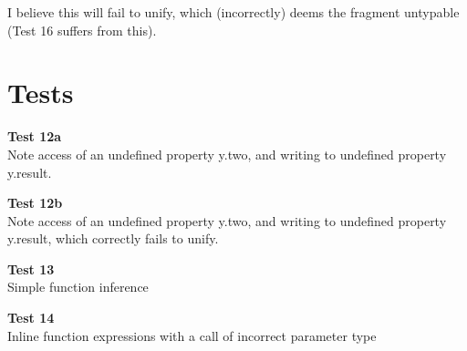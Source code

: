 \documentclass{article}
\begin{document}
	I believe this will fail to unify, which (incorrectly) deems the fragment untypable (Test 16 suffers from this).

\section{Tests}
\begin{parcolumns}[nofirstindent]{2}

 	\noindent
	\textbf{\large{Test 12a}}\\
	Note access of an undefined property y.two, and writing to undefined property y.result.

	\colplacechunks

 	\vspace{3em}
	\noindent
	\textbf{\large{Test 12b}} \\
	Note access of an undefined property y.two, and writing to undefined property y.result, which correctly fails to unify. 

	\colplacechunks

 	\vspace{3em}
	\noindent
	\textbf{\large{Test 13}}\\
	Simple function inference

	\colplacechunks

 	\vspace{3em}
	\noindent
	\textbf{\large{Test 14}}\\
	Inline function expressions with a call of incorrect parameter type


\end{parcolumns}
\end{document}
